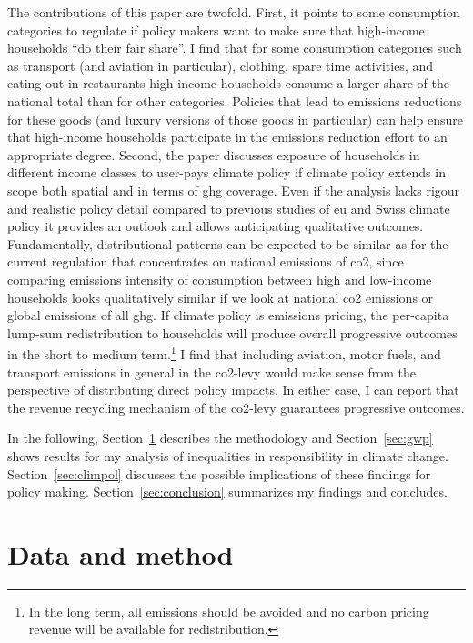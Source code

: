 \documentclass[referee, lineno, pdflatex,sn-apa]{sn-jnl}%
\theoremstyle{thmstyleone}%
\theoremstyle{thmstyletwo}%
\theoremstyle{thmstylethree}%
\begin{document}
The contributions of this paper are twofold.
First, it points to some consumption categories to regulate if policy makers want to make sure that high-income households ``do their fair share''.
I find that for some consumption categories such as transport (and aviation in particular), clothing, spare time activities, and eating out in restaurants high-income households consume a larger share of the national total than for other categories.
Policies that lead to emissions reductions for these goods (and luxury versions of those goods in particular) can help ensure that high-income households participate in the emissions reduction effort to an appropriate degree.
Second, the paper discusses exposure of households in different income classes to user-pays climate policy if climate policy extends in scope both spatial and in terms of \ac{ghg} coverage.
Even if the analysis lacks rigour and realistic policy detail compared to previous studies of \ac{eu} and Swiss climate policy \citep[e.g.,][]{landis_efficient_2019, landis_between-_2021} it provides an outlook and allows anticipating qualitative outcomes.
Fundamentally, distributional patterns can be expected to be similar as for the current regulation that concentrates on national emissions of \ac{co2}, since comparing emissions intensity of consumption between high and low-income households looks qualitatively similar if we look at national \ac{co2} emissions or global emissions of all \acs{ghg}.
If climate policy is emissions pricing, the per-capita lump-sum redistribution to households will produce overall progressive outcomes in the short to medium term.\footnote{%
  In the long term, all emissions should be avoided and no carbon pricing revenue will be available for redistribution.
}
I find that including aviation, motor fuels, and transport emissions in general in the \ac{co2}-levy would make sense from the perspective of distributing direct policy impacts.
In either case, I can report that the revenue recycling mechanism of the \ac{co2}-levy guarantees progressive outcomes.

In the following, Section~\ref{sec:dat_meth} describes the methodology and Section~\ref{sec:gwp} shows results for my analysis of inequalities in responsibility in climate change.
Section~\ref{sec:climpol} discusses the possible implications of these findings for policy making.
Section~\ref{sec:conclusion} summarizes my findings and concludes.
\clearpage

\section{Data and method}
\label{sec:dat_meth}
\end{document}
